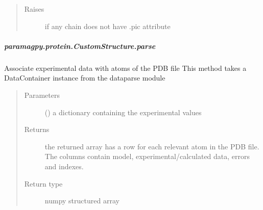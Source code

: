 \documentclass[a4paper,10pt,english,openany,oneside]{sphinxmanual}
\begin{document}
\begin{fulllineitems}
\begin{fulllineitems}
\begin{fulllineitems}
\begin{quote}
\begin{description}
\item[{Raises}] \leavevmode
\sphinxAtStartPar
{} \textendash{} if any chain does not have .pic attribute

\end{description}\end{quote}

\end{fulllineitems}



\subparagraph{paramagpy.protein.CustomStructure.parse}
\label{\detokenize{reference/generated/paramagpy.protein.CustomStructure.parse:paramagpy-protein-customstructure-parse}}\label{\detokenize{reference/generated/paramagpy.protein.CustomStructure.parse::doc}}

\begin{fulllineitems}
\label{\detokenize{reference/generated/paramagpy.protein.CustomStructure.parse:paramagpy.protein.CustomStructure.parse}}
\sphinxAtStartPar
Associate experimental data with atoms of the PDB file
This method takes a DataContainer instance from the
dataparse module
\begin{quote}\begin{description}
\item[{Parameters}] \leavevmode
\sphinxAtStartPar
{} () \textendash{} a dictionary containing the experimental values

\item[{Returns}] \leavevmode
\sphinxAtStartPar
{} \textendash{} the returned array has a row for each relevant atom
in the PDB file. The columns contain model,
experimental/calculated data, errors and indexes.

\item[{Return type}] \leavevmode
\sphinxAtStartPar
numpy structured array

\end{description}\end{quote}

\end{fulllineitems}




\end{fulllineitems}
\end{fulllineitems}
\end{document}
